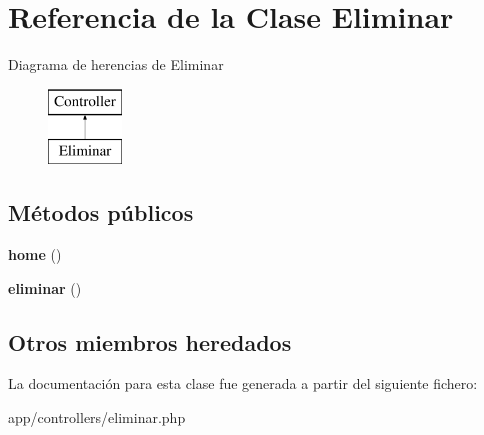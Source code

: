 \hypertarget{class_eliminar}{}\section{Referencia de la Clase Eliminar}
\label{class_eliminar}
Diagrama de herencias de Eliminar\begin{figure}[H]
\begin{center}
\leavevmode
\includegraphics[height=2.000000cm]{class_eliminar}
\end{center}
\end{figure}
\subsection*{Métodos públicos}
\begin{DoxyCompactItemize}
\item 
\hypertarget{class_eliminar_a174b8e4c7d4d7363c6f773671defdeff}{}{\bfseries home} ()\label{class_eliminar_a174b8e4c7d4d7363c6f773671defdeff}

\item 
\hypertarget{class_eliminar_ae05738af445a2eb4f3456604f1b9be8f}{}{\bfseries eliminar} ()\label{class_eliminar_ae05738af445a2eb4f3456604f1b9be8f}

\end{DoxyCompactItemize}
\subsection*{Otros miembros heredados}


La documentación para esta clase fue generada a partir del siguiente fichero\+:\begin{DoxyCompactItemize}
\item 
app/controllers/eliminar.\+php\end{DoxyCompactItemize}

